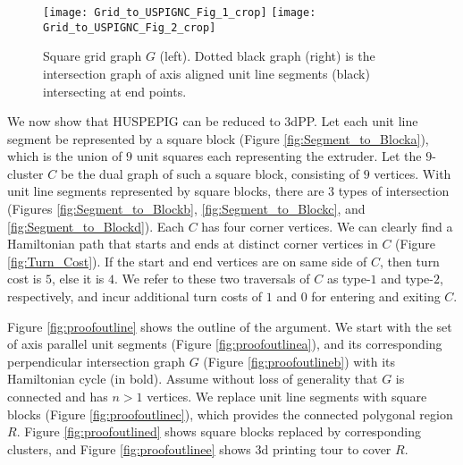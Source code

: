 \begin{figure}[ht!]
  \centering
  \texttt{[image: Grid\_to\_USPIGNC\_Fig\_1\_crop]}
  \hfill
  \texttt{[image: Grid\_to\_USPIGNC\_Fig\_2\_crop]}
  \caption{\label{fig:Grid_to_USPIGNC} Square grid graph $G$ (left).
    Dotted black graph (right) is the intersection graph of axis aligned unit line segments (black) intersecting at end points.
  }
\end{figure}
We now show that HUSPEPIG can be reduced to 3dPP. 
Let each unit line segment be represented by a square block (Figure \ref{fig:Segment_to_Blocka}), which is the union of $9$ unit squares each representing the extruder.
Let the $9$-cluster $C$ be the dual graph of such a square block, consisting of $9$ vertices. %
With unit line segments represented by square blocks, there are $3$ types of intersection (Figures \ref{fig:Segment_to_Blockb}, \ref{fig:Segment_to_Blockc}, and \ref{fig:Segment_to_Blockd}).
Each $C$ has four corner vertices.
We can clearly find a Hamiltonian path that starts and ends at distinct corner vertices in $C$ (Figure \ref{fig:Turn_Cost}).
If the start and end vertices are on same side of $C$, then turn cost is $5$, else it is $4$.
We refer to these two traversals of $C$ as type-$1$ and type-$2$, respectively, and incur additional turn costs of $1$ and $0$ for entering and exiting $C$.

Figure \ref{fig:proofoutline} shows the outline of the argument.
We start with the set of axis parallel unit segments (Figure \ref{fig:proofoutlinea}), and its corresponding perpendicular intersection graph $G$ (Figure \ref{fig:proofoutlineb}) with its Hamiltonian cycle (in bold).
Assume without loss of generality that $G$ is connected and has $n>1$ vertices.
We replace unit line segments with square blocks (Figure \ref{fig:proofoutlinec}), which provides the connected polygonal region $R$.
Figure \ref{fig:proofoutlined} shows square blocks replaced by corresponding clusters, and Figure \ref{fig:proofoutlinee} shows 3d printing tour to cover $R$.


